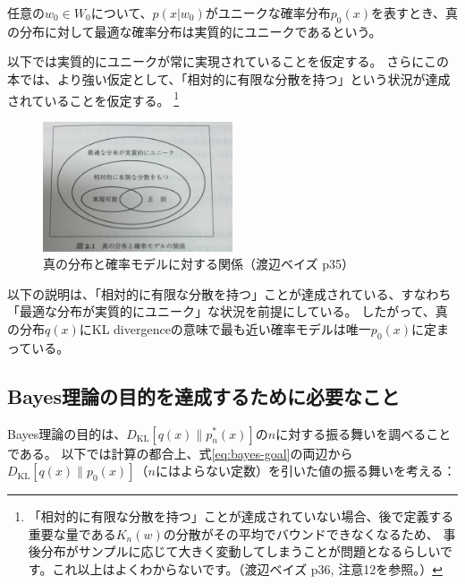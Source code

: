 \documentclass[dvipdfmx]{jsarticle}
\begin{document}
\begin{mybox}[実質的にユニーク]
    任意の$w_0\in W_0$について、$p(x|w_0)$がユニークな確率分布$p_0(x)$を表すとき、真の分布に対して最適な確率分布は実質的にユニークであるという。
\end{mybox}
以下では実質的にユニークが常に実現されていることを仮定する。
さらにこの本では、より強い仮定として、「相対的に有限な分散を持つ」という状況が達成されていることを仮定する。
\footnote{「相対的に有限な分散を持つ」ことが達成されていない場合、後で定義する重要な量である$K_n(w)$の分散がその平均でバウンドできなくなるため、
事後分布がサンプルに応じて大きく変動してしまうことが問題となるらしいです。これ以上はよくわからないです。（渡辺ベイズ p36, 注意12を参照。）}

\begin{figure}[H]
    \centering
    \includegraphics[width=0.5\textwidth]{yuugennnabunsan.jpg}
    \caption{真の分布と確率モデルに対する関係（渡辺ベイズ p35）}
    \label{fig:katei}
\end{figure}
以下の説明は、「相対的に有限な分散を持つ」ことが達成されている、すなわち「最適な分布が実質的にユニーク」な状況を前提にしている。
したがって、真の分布$q(x)$にKL divergenceの意味で最も近い確率モデルは唯一$p_0(x)$に定まっている。
\newpage


\subsection{Bayes理論の目的を達成するために必要なこと}
Bayes理論の目的は、$D_{\text{KL}}[q(x) \parallel p_n^{*}(x)]$の$n$に対する振る舞いを調べることである。
以下では計算の都合上、式\eqref{eq:bayes-goal}の両辺から$D_{\text{KL}}[q(x) \parallel p_0(x)]$（$n$にはよらない定数）を引いた値の振る舞いを考える：
\end{document}
